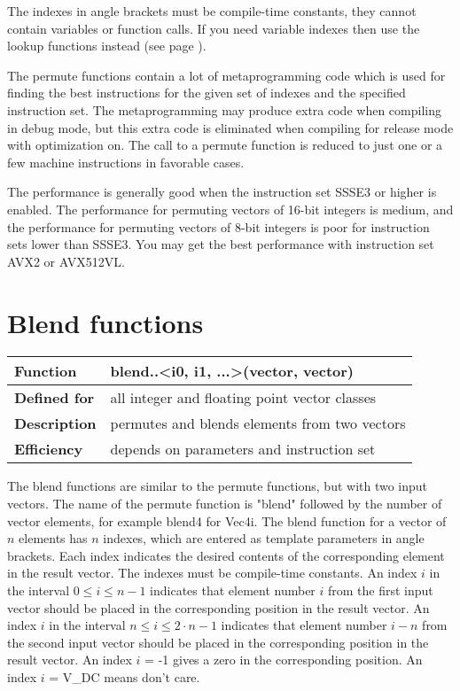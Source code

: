 \documentclass[vcl_manual.tex]{subfiles}
\begin{document}
The indexes in angle brackets must be compile-time constants, they cannot contain variables or function calls. If you need variable indexes then use the lookup functions instead (see page \pageref{LookupFunctions}).

The permute functions contain a lot of metaprogramming code which is used for finding the best instructions for the given set of indexes and the specified instruction set. The metaprogramming may produce extra code when compiling in debug mode, but this extra code is eliminated when compiling for release mode with optimization on. The call to a permute function is reduced to just one or a few machine instructions in favorable cases. 

The performance is generally good when the instruction set SSSE3 or higher is enabled. The performance for permuting vectors of 16-bit integers is medium, and the performance for permuting vectors of 8-bit integers is poor for instruction sets lower than SSSE3. You may get the best performance with instruction set AVX2 or AVX512VL.


\section{Blend functions}\label{BlendFunctions}

\begin{tabular}{|p{30mm}|p{120mm}|}
\hline
\bfseries Function & blend..\textless i0, i1, ...\textgreater(vector, vector) \\ \hline
\bfseries Defined for & all integer and floating point vector classes \\ \hline
\bfseries Description & permutes and blends elements from two vectors \\ \hline
\bfseries Efficiency & depends on parameters and instruction set \\ \hline
\end{tabular}

The blend functions are similar to the permute functions, but with two input vectors. 
The name of the permute function is "blend" followed by the number of vector elements, for example blend4 for Vec4i. The blend function for a vector of $n$ elements has $n$ indexes, which are entered as template parameters in angle brackets. Each index indicates the desired contents of the corresponding element in the result vector. The indexes must be compile-time constants.
An index $i$ in the interval $0 \leq i \leq n-1$ indicates that element number $i$ from the first input vector should be placed in the corresponding position in the result vector. An index $i$ in the interval $n \leq i \leq 2 \cdot n-1$ indicates that element number $i-n$ from the second input vector should be placed in the corresponding position in the result vector. An index $i$ = -1 gives a zero in the corresponding position. An index $i$ = V\_DC means don't care.
\end{document}
